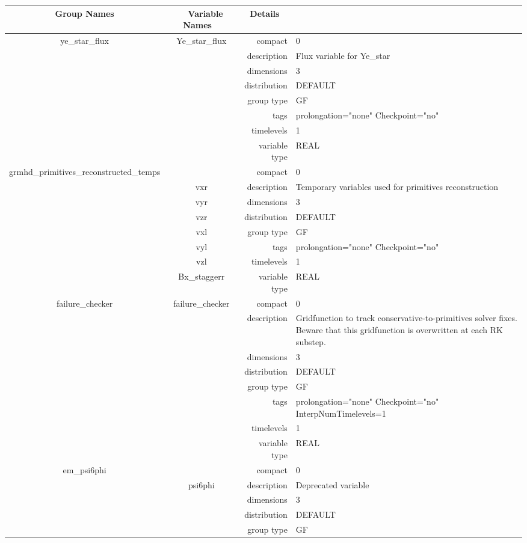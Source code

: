 \documentclass{article}
\begin{document}
\begin{tabular*}{150mm}{|c|c@{\extracolsep{\fill}}|rl|} \hline 
~ {\bf Group Names} ~ & ~ {\bf Variable Names} ~  &{\bf Details} ~ & ~ \\ 
\hline 
ye\_star\_flux & Ye\_star\_flux & compact & 0 \\ 
 &  & description & Flux variable for Ye\_star \\ 
 &  & dimensions & 3 \\ 
 &  & distribution & DEFAULT \\ 
 &  & group type & GF \\ 
 &  & tags & prolongation="none" Checkpoint="no" \\ 
 &  & timelevels & 1 \\ 
 &  & variable type & REAL \\ 
\hline 
grmhd\_primitives\_reconstructed\_temps &  & compact & 0 \\ 
 & vxr & description & Temporary variables used for primitives reconstruction \\ 
 & vyr & dimensions & 3 \\ 
 & vzr & distribution & DEFAULT \\ 
 & vxl & group type & GF \\ 
 & vyl & tags & prolongation="none" Checkpoint="no" \\ 
 & vzl & timelevels & 1 \\ 
 & Bx\_staggerr & variable type & REAL \\ 
\hline 
failure\_checker & failure\_checker & compact & 0 \\ 
 &  & description & Gridfunction to track conservative-to-primitives solver fixes. Beware that this gridfunction is overwritten at each RK substep. \\ 
 &  & dimensions & 3 \\ 
 &  & distribution & DEFAULT \\ 
 &  & group type & GF \\ 
 &  & tags & prolongation="none" Checkpoint="no" InterpNumTimelevels=1 \\ 
 &  & timelevels & 1 \\ 
 &  & variable type & REAL \\ 
\hline 
em\_psi6phi &  & compact & 0 \\ 
 & psi6phi & description & Deprecated variable \\ 
 &  & dimensions & 3 \\ 
 &  & distribution & DEFAULT \\ 
 &  & group type & GF \\ 

\end{tabular*}
\end{document}
